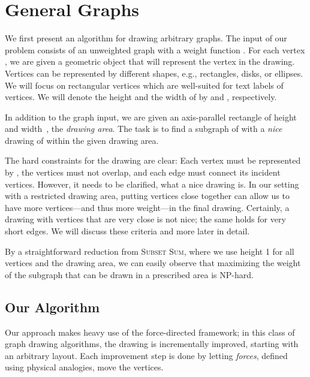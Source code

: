 \documentclass[]{llncs}
\begin{document}
\section{General Graphs}
\label{sec:general}

We first present an algorithm for drawing arbitrary graphs.
The input of our problem consists of an unweighted graph  with a weight function . For each vertex , we are given a geometric
object  that will represent the vertex in the drawing.
Vertices can be represented by different shapes, e.g., rectangles,
disks, or ellipses. We will focus on rectangular vertices which are
well-suited for text labels of vertices. We will denote the height
and the width of  by  and , respectively.

In addition to the graph input, we are given an axis-parallel
rectangle of height~ and width~, the \emph{drawing area}. The task is
to find a subgraph  of  with a \emph{nice} drawing of
 within the given drawing area.

The hard constraints for the drawing are clear: Each vertex 
must be represented by , the vertices must not overlap, and
each edge must connect its incident vertices. However, it needs to be
clarified, what a nice drawing is. In our setting with a
restricted drawing area, putting vertices close together can
allow us to have more vertices---and thus more weight---in the final
drawing. Certainly, a drawing with vertices that are very close
is not nice; the same holds for very short edges. We will
discuss these criteria and more later in detail.

By a straightforward reduction from \textsc{Subset Sum}, where we use
height 1 for all vertices and the drawing area, we can easily
observe that maximizing the weight of the subgraph that can be drawn
in a prescribed area is NP-hard.


\subsection{Our Algorithm}
\label{sec:gen-algo}
Our approach makes heavy use of the force-directed framework; in this
class of graph drawing algorithms, the drawing is incrementally
improved, starting with an arbitrary layout. Each improvement step is
done by letting \emph{forces}, defined using physical analogies, move
the vertices.
\end{document}
